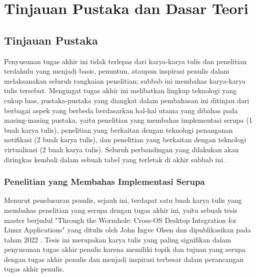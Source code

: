 \chapter{Tinjauan Pustaka dan Dasar Teori}

\section{Tinjauan Pustaka}

Penyusunan tugas akhir ini tidak terlepas dari karya-karya tulis dan penelitian terdahulu yang menjadi basis, penuntun, ataupun inspirasi penulis dalam melaksanakan seluruh rangkaian penelitian; subbab ini membahas karya-karya tulis tersebut. Mengingat tugas akhir ini melibatkan lingkup teknologi yang cukup luas, pustaka-pustaka yang diangkat dalam pembahasan ini ditinjau dari berbagai aspek yang berbeda berdasarkan hal-hal utama yang dibahas pada masing-masing pustaka, yaitu penelitian yang membahas implementasi serupa (1 buah karya tulis), penelitian yang berkaitan dengan teknologi penanganan notifikasi (2 buah karya tulis), dan penelitian yang berkaitan dengan teknologi virtualisasi (2 buah karya tulis). Seluruh perbandingan yang dilakukan akan diringkas kembali dalam sebuah tabel yang terletak di akhir subbab ini.

\subsection{Penelitian yang Membahas Implementasi Serupa}

Menurut penelusuran penulis, sejauh ini, terdapat satu buah karya tulis yang membahas penelitian yang serupa dengan tugas akhir ini, yaitu sebuah tesis master berjudul "Through the Wormhole: Cross-OS Desktop Integration for Linux Applications" yang ditulis oleh John Ingve Olsen dan dipublikasikan pada tahun 2022 \cite{olsen-2022-through-the-wormhole}. Tesis ini merupakan karya tulis yang paling signifikan dalam penyusunan tugas akhir penulis karena memiliki topik dan tujuan yang serupa dengan tugas akhir penulis dan menjadi inspirasi terbesar dalam perancangan tugas akhir penulis.

